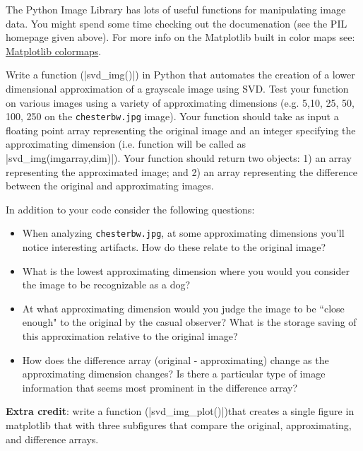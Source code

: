 \documentclass[11pt,letterpaper]{article}
\begin{document}
The Python Image Library has lots of useful functions for manipulating image data. You might spend some time checking out the documenation (see the PIL homepage given above). For more info on the Matplotlib built in color maps see: \href{http://matplotlib.sourceforge.net/examples/pylab_examples/show_colormaps.html}{Matplotlib colormaps}.



\begin{assignment}
Write a function (|svd_img()|) in Python that automates the creation of a lower dimensional approximation of a grayscale image using SVD.  Test your function on various images using a variety of approximating dimensions (e.g. 5,10, 25, 50, 100, 250 on the \texttt{chesterbw.jpg} image).  Your function should take as input a floating point array representing the original image and an integer specifying the approximating dimension (i.e. function will be called as |svd_img(imgarray,dim)|). Your function should return two objects: 1) an array representing the approximated image; and 2) an array representing the difference between the original and approximating images.

In addition to your code consider the following questions:

\begin{itemize}
\item When analyzing \texttt{chesterbw.jpg}, at some approximating dimensions you'll notice interesting artifacts. How do these relate to the original image? 

\item What is the lowest approximating dimension where you would you consider the image to be recognizable as a dog?
 
\item At what approximating dimension would you judge the  image to be ``close enough"  to the original by the casual observer? What is the storage saving of this approximation relative to the original image?

\item How does the difference array (original - approximating) change as the approximating dimension changes? Is there a particular type of image information that seems most prominent in the difference array?
\end{itemize}

\textbf{Extra credit}: write a function (|svd_img_plot()|)that creates a single figure in matplotlib that with three subfigures that compare the original, approximating, and difference arrays. 

\end{assignment}
\end{document}
